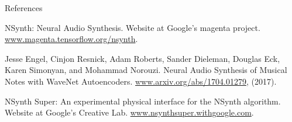 References 

NSynth: Neural Audio Synthesis. Website at Google's magenta project. \url{www.magenta.tensorflow.org/nsynth}.

Jesse Engel, Cinjon Resnick, Adam Roberts, Sander Dieleman, Douglas Eck, Karen Simonyan, and Mohammad Norouzi. Neural Audio Synthesis of Musical Notes with WaveNet Autoencoders. \url{www.arxiv.org/abs/1704.01279}, (2017).

NSynth Super: An experimental physical interface for the NSynth algorithm. Website at Google's Creative Lab. \url{www.nsynthsuper.withgoogle.com}.

